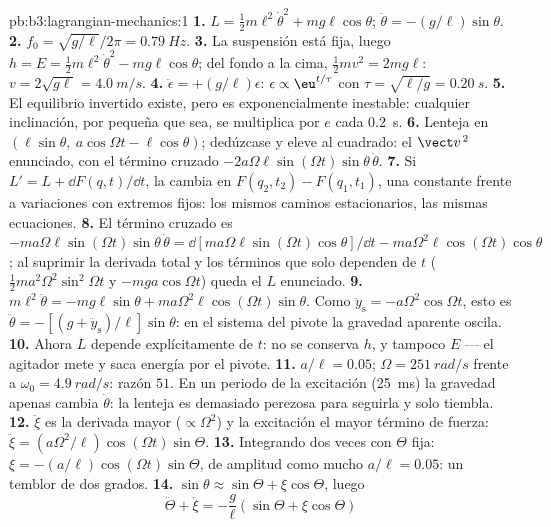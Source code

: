 \begin{solution}{pb:b3:lagrangian-mechanics:1}
\textbf{1.} $L = \tfrac12 m\ell^2\dot\theta^2 + mg\ell\cos\theta$;
$\ddot\theta = -(g/\ell)\sin\theta$.
\textbf{2.} $f_0 = \sqrt{g/\ell}/2\pi = \qty{0.79}{Hz}$.
\textbf{3.} La suspensión está fija, luego $h = E = \tfrac12
m\ell^2\dot\theta^2 - mg\ell\cos\theta$; del fondo a la cima, $\tfrac12
mv^2 = 2mg\ell$: $v = 2\sqrt{g\ell} = \qty{4.0}{m/s}$.
\textbf{4.} $\ddot\epsilon = +(g/\ell)\epsilon$: $\epsilon \propto
\eu^{t/\tau}$ con $\tau = \sqrt{\ell/g} = \qty{0.20}{s}$.
\textbf{5.} El equilibrio invertido existe, pero es exponencialmente
inestable: cualquier inclinación, por pequeña que sea, se multiplica por $e$
cada \qty{0.2}{s}.
\textbf{6.} Lenteja en $(\ell\sin\theta,\ a\cos\Omega t - \ell\cos\theta)$;
dedúzcase y eleve al cuadrado: el $\vect v^{\,2}$ enunciado, con el término
cruzado $-2a\Omega\ell\sin(\Omega t)\sin\theta\,\dot\theta$.
\textbf{7.} Si $L' = L + \dd F(q,t)/\dd t$, la  cambia en
$F(q_2, t_2) - F(q_1, t_1)$, una constante frente a variaciones con extremos
fijos: los mismos caminos estacionarios, las mismas ecuaciones.
\textbf{8.} El término cruzado es $-ma\Omega\ell\sin(\Omega t)\sin\theta\,
\dot\theta = \dd[ma\Omega\ell\sin(\Omega t)\cos\theta]/\dd t -
ma\Omega^2\ell\cos(\Omega t)\cos\theta$; al suprimir la derivada total y los
términos que solo dependen de $t$ ($\tfrac12 ma^2\Omega^2\sin^2\Omega t$ y
$-mga\cos\Omega t$) queda el $L$ enunciado.
\textbf{9.} $m\ell^2\ddot\theta = -mg\ell\sin\theta +
ma\Omega^2\ell\cos(\Omega t)\sin\theta$. Como $\ddot y_{\text{s}} =
-a\Omega^2\cos\Omega t$, esto es $\ddot\theta =
-[(g + \ddot y_{\text{s}})/\ell]\sin\theta$: en el sistema del pivote la
gravedad aparente oscila.
\textbf{10.} Ahora $L$ depende explícitamente de $t$: no se conserva $h$, y
tampoco $E$ --- el agitador mete y saca energía por el pivote.
\textbf{11.} $a/\ell = 0.05$; $\Omega = \qty{251}{rad/s}$ frente a
$\omega_0 = \qty{4.9}{rad/s}$: razón $51$. En un periodo de la excitación
(\qty{25}{ms}) la gravedad apenas cambia $\dot\theta$: la lenteja es
demasiado perezosa para seguirla y solo tiembla.
\textbf{12.} $\ddot\xi$ es la derivada mayor ($\propto\Omega^2$) y la
excitación el mayor término de fuerza: $\ddot\xi =
(a\Omega^2/\ell)\cos(\Omega t)\sin\Theta$.
\textbf{13.} Integrando dos veces con $\Theta$ fija: $\xi =
-(a/\ell)\cos(\Omega t)\sin\Theta$, de amplitud como mucho $a/\ell =
0.05$: un temblor de dos grados.
\textbf{14.} $\sin\theta \approx \sin\Theta + \xi\cos\Theta$, luego
\[
\ddot\Theta + \ddot\xi = -\frac{g}{\ell}(\sin\Theta + \xi\cos\Theta)
\]
\end{solution}
